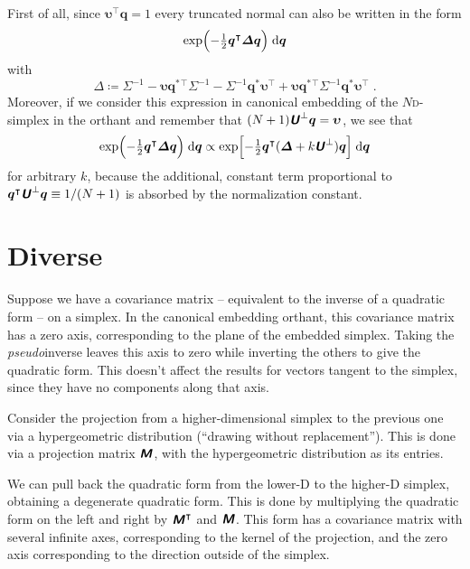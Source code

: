 \documentclass[\ifafour a4paper,12pt,\else a5paper,10pt,\fi%
onecolumn,oneside,article,%
british%
]{memoir}
\theoremstyle{remark}
\theoremstyle{innote}
\newcommand*{\mathte}[1]{\textbf{\textit{\textsf{#1}}}}
\newcommand*{\di}{\mathrm{d}}%
\newcommand*{\defd}{\coloneqq}
\renewcommand*{\|}[1][]{\nonscript\,#1\vert\nonscript\;\mathopen{}}
\newcommand*{\T}{^\intercal}%
\newcommand*{\dd}{\textsc{d}}
\newcommand*{\yq}{\bm{q}}
\newcommand*{\yu}{\bm{\upsilon}}
\newcommand*{\yuo}{\mathte{U}^{\mathord{\perp}}}
\newcommand*{\ymm}{\mathte{M}}
\newcommand*{\yqr}{\yq^{*}}
\newcommand*{\ySigma}{\bm{\varSigma}}
\newcommand*{\yDelta}{\bm{\varDelta}}
\begin{document}
First of all, since $\yu\T\yq = 1$ every truncated normal can also be
written in the form
\begin{equation}
  \label{eq:normal_simple}
  \exp\Bigl(-\tfrac{1}{2}
\yq\T \yDelta \yq
  \Bigr) \;\di\yq
\end{equation}
with
\begin{equation}
  \label{eq:delta_simple_normal}
  \yDelta \defd \ySigma^{-1} - \yu\yqr{}\T\ySigma^{-1} - \ySigma^{-1}\yqr\yu\T
  + \yu\yqr{}\T\ySigma^{-1}\yqr\yu\T \;.
\end{equation}
Moreover, if we consider this expression in canonical embedding of the
$N$\dd-simplex in the orthant and remember that $(N+1)\yuo\yq =\yu$, we see that
\begin{equation}
  \label{eq:normal_arbitrary_projection}
  \exp\Bigl(-\tfrac{1}{2}
\yq\T \yDelta \yq
  \Bigr) \;\di\yq
  \propto
    \exp\Bigl[-\tfrac{1}{2}
\yq\T (\yDelta + k \yuo) \yq
  \Bigr] \;\di\yq
\end{equation}
for arbitrary $k$, because the additional, constant term proportional to
$\yq\T \yuo \yq \equiv 1/(N+1)$ is absorbed by the normalization constant.



\section{Diverse}
\label{sec:diverse}

Suppose we have a covariance matrix -- equivalent to the inverse of a
quadratic form -- on a simplex. In the canonical embedding orthant, this
covariance matrix has a zero axis, corresponding to the plane of the
embedded simplex. Taking the \emph{pseudo}inverse leaves this axis to zero
while inverting the others to give the quadratic form. This doesn't affect
the results for vectors tangent to the simplex, since they have no
components along that axis.

Consider the projection from a higher-dimensional simplex to the previous
one via a hypergeometric distribution (\enquote{drawing without
  replacement}). This is done via a projection matrix $\ymm$, with the
hypergeometric distribution as its entries.

We can pull back the quadratic form from the lower-D to the higher-D
simplex, obtaining a degenerate quadratic form. This is done by multiplying
the quadratic form on the left and right by $\ymm\T$ and $\ymm$. This form
has a covariance matrix with several infinite axes, corresponding to the
kernel of the projection, and the zero axis corresponding to the direction
outside of the simplex.
\end{document}
